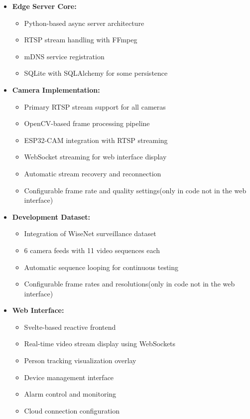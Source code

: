 \documentclass[conference]{IEEEtran}
\begin{document}
\begin{itemize}
      \item \textbf{Edge Server Core:}
            \begin{itemize}
                  \item Python-based async server architecture
                  \item RTSP stream handling with FFmpeg
                  \item mDNS service registration
                  \item SQLite with SQLAlchemy for some persistence
            \end{itemize}
      \item \textbf{Camera Implementation:}
            \begin{itemize}
                  \item Primary RTSP stream support for all cameras
                  \item OpenCV-based frame processing pipeline
                  \item ESP32-CAM integration with RTSP streaming
                  \item WebSocket streaming for web interface display
                  \item Automatic stream recovery and reconnection
                  \item Configurable frame rate and quality settings(only in code not in the web interface)
            \end{itemize}
      \item \textbf{Development Dataset:}
            \begin{itemize}
                  \item Integration of WiseNet surveillance dataset
                  \item 6 camera feeds with 11 video sequences each
                  \item Automatic sequence looping for continuous testing
                  \item Configurable frame rates and resolutions(only in code not in the web interface)
            \end{itemize}
      \item \textbf{Web Interface:}
            \begin{itemize}
                  \item Svelte-based reactive frontend
                  \item Real-time video stream display using WebSockets
                  \item Person tracking visualization overlay
                  \item Device management interface
                  \item Alarm control and monitoring
                  \item Cloud connection configuration
            \end{itemize}
\end{itemize}
\end{document}
